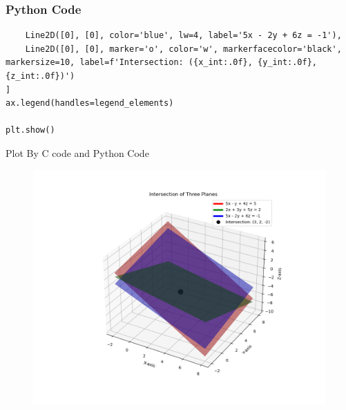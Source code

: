 \documentclass{beamer}
\begin{document}
\begin{frame}[fragile]
\frametitle{Python Code}
\begin{lstlisting}
    Line2D([0], [0], color='blue', lw=4, label='5x - 2y + 6z = -1'),
    Line2D([0], [0], marker='o', color='w', markerfacecolor='black', markersize=10, label=f'Intersection: ({x_int:.0f}, {y_int:.0f}, {z_int:.0f})')
]
ax.legend(handles=legend_elements)

plt.show()
\end{lstlisting}
\end{frame}
\begin{frame}{Plot By C code and Python Code}
    \begin{figure}
    \centering
    \includegraphics[width=0.7\columnwidth]{figs/Figure_1.png}
    \label{fig:placeholder}
    \caption{}
\end{figure}
\end{frame}
\end{document}
